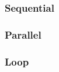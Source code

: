 \documentclass[]{article}
\begin{document}
\subsubsection{Sequential}

\subsubsection{Parallel}

\subsubsection{Loop}



\end{document}
